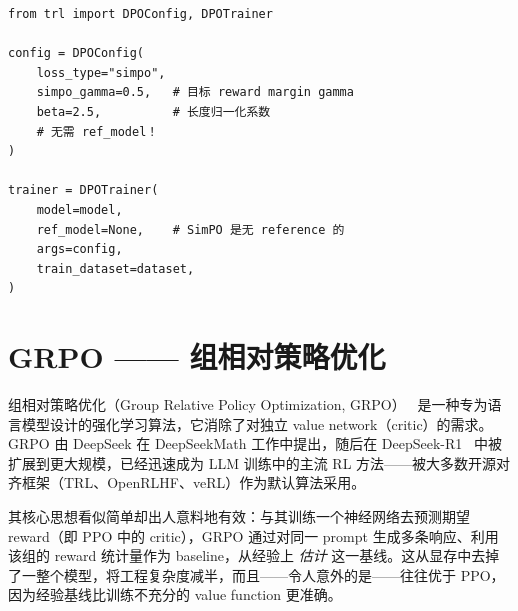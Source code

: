 \begin{examplebox}
\begin{lstlisting}[style=pythonstyle]
from trl import DPOConfig, DPOTrainer

config = DPOConfig(
    loss_type="simpo",
    simpo_gamma=0.5,   # 目标 reward margin gamma
    beta=2.5,          # 长度归一化系数
    # 无需 ref_model！
)

trainer = DPOTrainer(
    model=model,
    ref_model=None,    # SimPO 是无 reference 的
    args=config,
    train_dataset=dataset,
)
\end{lstlisting}
\end{examplebox}
\chapter{GRPO —— 组相对策略优化}
\label{grpo-group-relative-policy-optimization}

组相对策略优化（Group Relative Policy Optimization, GRPO）~\cite{shao2024deepseekmath} 是一种专为语言模型设计的强化学习算法，它消除了对独立 value network（critic）的需求。GRPO 由 DeepSeek 在 DeepSeekMath 工作中提出，随后在 DeepSeek-R1~\cite{deepseek2025r1} 中被扩展到更大规模，已经迅速成为 LLM 训练中的主流 RL 方法——被大多数开源对齐框架（TRL、OpenRLHF、veRL）作为默认算法采用。

其核心思想看似简单却出人意料地有效：与其训练一个神经网络去预测期望 reward（即 PPO 中的 critic），GRPO 通过对同一 prompt 生成多条响应、利用该组的 reward 统计量作为 baseline，从经验上 \emph{估计} 这一基线。这从显存中去掉了一整个模型，将工程复杂度减半，而且——令人意外的是——往往优于 PPO，因为经验基线比训练不充分的 value function 更准确。

